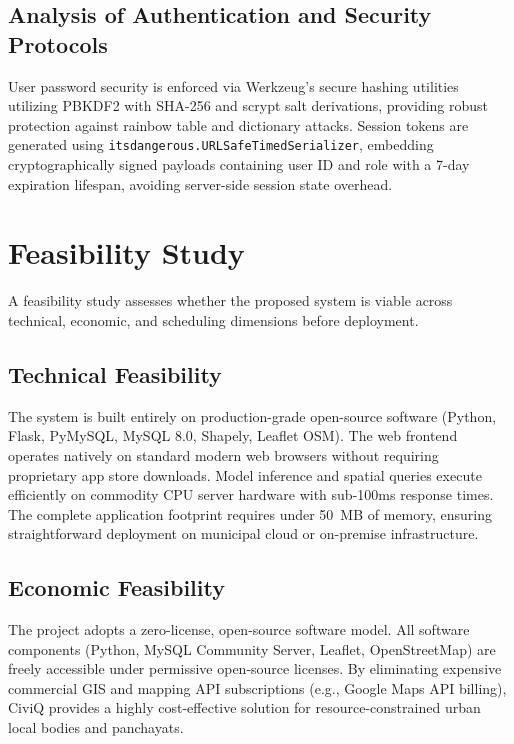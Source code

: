\documentclass[12pt,a4paper]{report}
\begin{document}
\section{Analysis of Authentication and Security Protocols}
User password security is enforced via Werkzeug's secure hashing utilities utilizing PBKDF2 with SHA-256 and scrypt salt derivations, providing robust protection against rainbow table and dictionary attacks. Session tokens are generated using \texttt{itsdangerous.URLSafeTimedSerializer}, embedding cryptographically signed payloads containing user ID and role with a 7-day expiration lifespan, avoiding server-side session state overhead.


\chapter{Feasibility Study}

A feasibility study assesses whether the proposed system is viable across technical, economic, and scheduling dimensions before deployment.

\section{Technical Feasibility}
The system is built entirely on production-grade open-source software (Python, Flask, PyMySQL, MySQL 8.0, Shapely, Leaflet OSM). The web frontend operates natively on standard modern web browsers without requiring proprietary app store downloads. Model inference and spatial queries execute efficiently on commodity CPU server hardware with sub-100ms response times. The complete application footprint requires under 50~MB of memory, ensuring straightforward deployment on municipal cloud or on-premise infrastructure.

\section{Economic Feasibility}
The project adopts a zero-license, open-source software model. All software components (Python, MySQL Community Server, Leaflet, OpenStreetMap) are freely accessible under permissive open-source licenses. By eliminating expensive commercial GIS and mapping API subscriptions (e.g., Google Maps API billing), CiviQ provides a highly cost-effective solution for resource-constrained urban local bodies and panchayats.
\end{document}
